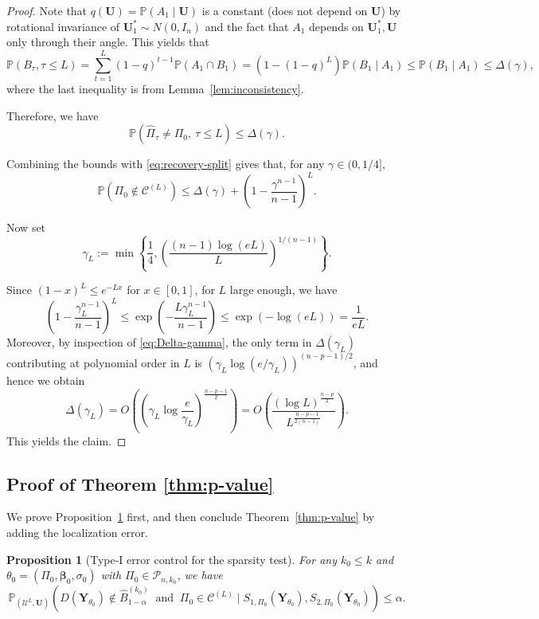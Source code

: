 \documentclass[11pt, reqno]{amsart}
\newcommand{\bP}{\mathbb{P}}
\renewcommand{\hat}{\widehat}
\renewcommand{\le}{\leqslant}
\newcommand{\mC}{\mathcal{C}}
\newcommand{\mP}{\mathcal{P}}
\newcommand{\1}{\mbox{1}\hspace{-0.25em}\mbox{l}}
\theoremstyle{definition}\newtheorem{problem}{Problem}[section]
\theoremstyle{definition}\newtheorem{definition}[problem]{Definition}
\theoremstyle{remark}\newtheorem{assumption}{Assumption}
\theoremstyle{remark}\newtheorem{remark}[problem]{Remark}
\theoremstyle{definition}\newtheorem{example}[problem]{Example}
\theoremstyle{plain}\newtheorem{theorem}[problem]{Theorem}
\theoremstyle{plain}\newtheorem{question}[problem]{Question}
\theoremstyle{plain}\newtheorem{lemma}[problem]{Lemma}
\theoremstyle{plain}\newtheorem{proposition}[problem]{Proposition}
\theoremstyle{plain}\newtheorem{corollary}[problem]{Corollary}
\theoremstyle{plain}\newtheorem{conjecture}[problem]{Conjecture}
\begin{document}
\begin{proof}
Note that $q(\bm U)=\bP(A_1\mid \bm U)$ is a constant (does not depend on $\bm U$) by rotational
invariance of $\bm U_1^*\sim N(0,I_n)$ and the fact that $A_1$ depends on $\bm U_1^*,\bm U$
only through their angle. This yields that
\[
\bP(B_\tau,\tau\le L)
=\sum_{t=1}^L (1-q)^{t-1}\bP(A_1\cap B_1)
=(1-(1-q)^L)\bP(B_1\mid A_1)
\le \bP(B_1\mid A_1)\le \Delta(\gamma),
\]
where the last inequality is from Lemma~\ref{lem:inconsistency}.

Therefore, we have
\[
\bP(\hat\Pi_\tau\neq\Pi_0,\ \tau\le L)\le \Delta(\gamma).
\]

Combining the bounds with \eqref{eq:recovery-split} gives that, for any $\gamma\in(0,1/4]$,
\[
\bP(\Pi_0\notin\mC^{(L)})
\le \Delta(\gamma)+\left(1-\frac{\gamma^{n-1}}{n-1}\right)^L.
\]

Now set 
\begin{equation}\label{eq:gamma-L}
  \gamma_L := \min\left\{\frac14, \left(\frac{(n-1)\log(e L)}{L}\right)^{1/(n-1)}\right\}.  
\end{equation}

Since $(1-x)^L\le e^{-Lx}$ for $x\in[0,1]$, for $L$ large enough, we have
\[
\left(1-\frac{\gamma_L^{n-1}}{n-1}\right)^L
\le \exp\left(-\frac{L\gamma_L^{n-1}}{n-1}\right)
\le \exp(-\log(eL))=\frac{1}{eL}.
\]
Moreover, by inspection of \eqref{eq:Delta-gamma}, the only term in $\Delta(\gamma_L)$ contributing at polynomial order in $L$
is $\left(\gamma_L\log(e/\gamma_L)\right)^{(n-p-1)/2}$, and hence we obtain
\[
\Delta(\gamma_L)
=
O\left(\left(\gamma_L\log\frac{e}{\gamma_L}\right)^{\frac{n-p-1}{2}}\right)
=
O\left(\frac{(\log L)^{\frac{n-p}{2}}}{L^{\frac{n-p-1}{2(n-1)}}}\right).
\]
This yields the claim.
\end{proof}



\subsection{Proof of Theorem \ref{thm:p-value}}
We prove Proposition~\ref{thm:p-value_without_delta} first, and then conclude Theorem~\ref{thm:p-value} by adding the localization error.

\begin{proposition}[Type-I error control for the sparsity test]\label{thm:p-value_without_delta}
For any $k_0\le k$ and $\theta_0=(\Pi_0,\bm\beta_0,\sigma_0)$ with $\Pi_0\in\mP_{n,k_0}$, we have
\begin{equation}\label{eq:conditional-validity-k0}
\bP_{\left(\mathcal{U}^L, \bm{U}\right)}\left(
D(\bm Y_{\theta_0})\notin \hat{B}^{(k_0)}_{1-\alpha}\ \text{ and }\ \Pi_0\in \mC^{(L)}
\mid 
S_{1,\Pi_0}(\bm Y_{\theta_0}),S_{2,\Pi_0}(\bm Y_{\theta_0})
\right)\le \alpha.
\end{equation}
\end{proposition}
\end{document}
